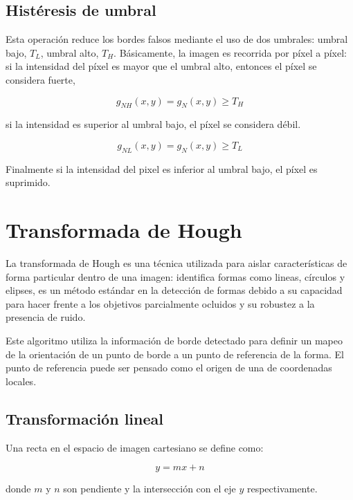 \subsection{Histéresis de umbral}

Esta operación reduce los bordes falsos mediante el uso de dos umbrales: umbral bajo, $T_L$, umbral alto, $T_H$. Básicamente, la imagen es recorrida por píxel a píxel: si la intensidad del píxel es mayor que el umbral alto, entonces el píxel se considera fuerte,

\begin{equation}
g_{NH}(x,y) = g_{N}(x,y)\geq T_H
\end{equation}

si la intensidad es superior al umbral bajo, el píxel se considera débil.  

\begin{equation}
g_{NL}(x,y) = g_{N}(x,y)\geq T_L
\end{equation}

Finalmente si la intensidad del pixel es inferior al umbral bajo, el píxel es suprimido.

\section{Transformada de Hough}


La transformada de Hough es una técnica utilizada para aislar características de forma particular dentro de una imagen: identifica formas como lineas, círculos y elipses, es un método estándar en la detección de formas debido a su capacidad para hacer frente a los objetivos parcialmente ocluidos y su robustez a la presencia de ruido\cite{Illingworth1988}.

Este algoritmo utiliza la información de borde detectado para definir un mapeo de la orientación de un punto de borde a un punto de referencia de la forma. El punto de referencia puede ser pensado como el origen de una de coordenadas locales\cite{Ballard1987}.

\subsection{Transformación lineal}

Una recta en el espacio de imagen cartesiano se define como:

\begin{equation}
y=mx+n
\end{equation}

donde $m$ y $n$ son pendiente y la intersección con el eje $y$ respectivamente. 

